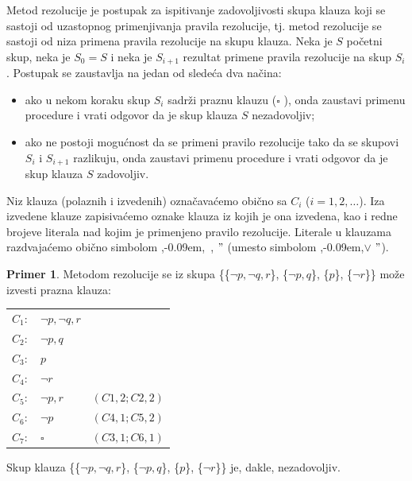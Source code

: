 \documentclass[12pt, a4paper, titlepage, twoside]{article}
\theoremstyle{definition}
\newtheorem{pr}{\sc Primer}
\def\zn{,\kern-0.09em,}
\begin{document}
Metod rezolucije je postupak za ispitivanje zadovoljivosti skupa klauza koji
se sastoji od uzastopnog primenjivanja pravila rezolucije, tj. metod rezolucije se sastoji 
od niza primena pravila rezolucije na skupu klauza. Neka je $S$ po\v cetni
skup, neka je $S_0 = S$ i neka je $S_{i+1}$ rezultat primene pravila rezolucije na skup
$S_i$. Postupak se zaustavlja na jedan od slede\'ca dva na\v cina: 
\begin{itemize}
	\item ako u nekom koraku skup $S_i$ sadr\v zi praznu klauzu ($\square$ ), onda zaustavi
primenu procedure i vrati odgovor da je skup klauza $S$ nezadovoljiv;
	\item ako ne postoji mogu\'cnost da se primeni pravilo rezolucije tako da se
skupovi $S_i$ i $S_{i+1}$ razlikuju, onda zaustavi primenu procedure i vrati
odgovor da je skup klauza $S$ zadovoljiv.
\end{itemize}


Niz klauza (polaznih i izvedenih) ozna\v cava\'cemo obi\v cno sa $C_i$ ($i = 1, 2,\dots$).
Iza izvedene klauze zapisiva\'cemo oznake klauza iz kojih je ona izvedena, kao
i redne brojeve literala nad kojim je primenjeno pravilo rezolucije. Literale u
klauzama razdvaja\'cemo obi\v cno simbolom \zn ~, $"$ (umesto simbolom \zn $ \lor $ $"$).


\begin{pr}
Metodom rezolucije se iz skupa \{\{$\neg p, \neg q, r$\}, \{$\neg p, q$\}, \{$p$\}, \{$\neg r$\}\}
mo\v ze izvesti prazna klauza:
\begin{center}
\begin{tabular}{l l l}
	
	$C_1 :$ & $\neg p, \neg q, r$  \\
	
	$C_2 :$ & $\neg p, q$  \\
	
	$C_3 :$ & $p$  \\
	
	$C_4 :$ & $\neg r$ \\ \hline
	
	$C_5 :$ & $\neg p, r$ & $(C1, 2; C2, 2)$ \\
	
	$C_6 :$ & $\neg p$ & $(C4, 1; C5, 2)$ \\
	
	$C_7 :$ & $\square$ &  $(C3, 1; C6, 1)$ 
	
\end{tabular}
\end{center}
Skup klauza \{\{$\neg p, \neg q, r$\}, \{$\neg p, q$\}, \{$p$\}, \{$\neg r$\}\} je, 
dakle, nezadovoljiv.
\end{pr}
\end{document}
